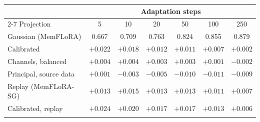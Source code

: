 \begin{tabular}{@{}l cccccc@{}}
\toprule
 & \multicolumn{6}{c}{Adaptation steps} \\
\cmidrule(l){2-7}
Projection & 5 & 10 & 20 & 50 & 100 & 250 \\
\midrule
Gaussian (MemFLoRA) & 0.667 & 0.709 & 0.763 & 0.824 & 0.855 & 0.879 \\
\midrule
Calibrated & $+0.022$ & $+0.018$ & $+0.012$ & $+0.011$ & $+0.007$ & $+0.002$ \\
Channels, balanced & $+0.004$ & $+0.004$ & $+0.003$ & $+0.003$ & $+0.001$ & $-0.002$ \\
Principal, source data & $+0.001$ & $-0.003$ & $-0.005$ & $-0.010$ & $-0.011$ & $-0.009$ \\
Replay (MemFLoRA-SG) & $+0.013$ & $+0.015$ & $+0.013$ & $+0.013$ & $+0.011$ & $+0.007$ \\
Calibrated, replay & $+0.024$ & $+0.020$ & $+0.017$ & $+0.017$ & $+0.013$ & $+0.006$ \\
\botrule
\end{tabular}
